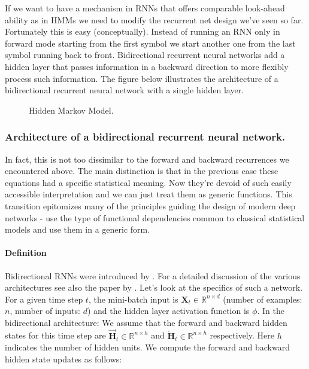 If we want to have a mechanism in RNNs that offers comparable look-ahead ability as in HMMs we need to modify the recurrent net design we’ve seen so far. Fortunately this is easy (conceptually). Instead of running an RNN only in forward mode starting from the first symbol we start another one from the last symbol running back to front. Bidirectional recurrent neural networks add a hidden layer that passes information in a backward direction to more flexibly process such information. The figure below illustrates the architecture of a bidirectional recurrent neural network with a single hidden layer.

\begin{figure}[hpt]
	\centering
	
	\caption{Hidden Markov Model.}
	\label{fig:birnn}
\end{figure}

\subsubsection{Architecture of a bidirectional recurrent neural network.}

In fact, this is not too dissimilar to the forward and backward recurrences we encountered above. The main distinction is that in the previous case these equations had a specific statistical meaning. Now they’re devoid of such easily accessible interpretation and we can just treat them as generic functions. This transition epitomizes many of the principles guiding the design of modern deep networks - use the type of functional dependencies common to classical statistical models and use them in a generic form.

\paragraph{Definition}

Bidirectional RNNs were introduced by \citet{Schuster1997}. For a detailed discussion of the various architectures see also the paper by \citet{Graves2005}. Let's look at the specifics of such a network.
For a given time step $t$, the mini-batch input is $\mathbf{X}_t \in \mathbb{R}^{n \times d}$ (number of examples: $n$, number of inputs: $d$) and the hidden layer activation function is $\phi$. In the bidirectional architecture:
We assume that the forward and backward hidden states for this time step are $\overrightarrow{\mathbf{H}}_t  \in \mathbb{R}^{n \times h}$ and $\overleftarrow{\mathbf{H}}_t  \in \mathbb{R}^{n \times h}$ respectively. Here $h$ indicates the number of hidden units. We compute the forward and backward hidden state updates as follows:

